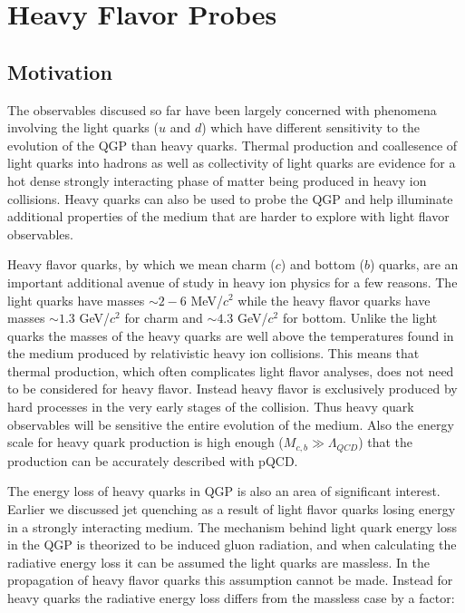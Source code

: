 \section{Heavy Flavor Probes}

\subsection{Motivation}

The observables discused so far have been largely concerned with phenomena involving the light quarks ($u$ and $d$) which have different sensitivity to the evolution of the QGP than heavy quarks. Thermal production and coallesence of light quarks into hadrons as well as collectivity of light quarks are evidence for a hot dense strongly interacting phase of matter being produced in heavy ion collisions. Heavy quarks can also be used to probe the QGP and help illuminate additional properties of the medium that are harder to explore with light flavor observables. 

Heavy flavor quarks, by which we mean charm ($c$) and bottom ($b$) quarks, are an important additional avenue of study in heavy ion physics for a few reasons. The light quarks have masses $\sim2-6$ MeV/$c^2$ while the heavy flavor quarks have masses $\sim1.3$ GeV/$c^2$ for charm and $\sim4.3$ GeV/$c^2$ for bottom. Unlike the light quarks the masses of the heavy quarks are well above the temperatures found in the medium produced by relativistic heavy ion collisions. This means that thermal production, which often complicates light flavor analyses, does not need to be considered for heavy flavor. Instead heavy flavor is exclusively produced by hard processes in the very early stages of the collision. Thus heavy quark observables will be sensitive the entire evolution of the medium. Also the energy scale for heavy quark production is high enough ($M_{c,b} \gg \Lambda_{QCD}$) that the production can be accurately described with pQCD.

The energy loss of heavy quarks in QGP is also an area of significant interest. Earlier we discussed jet quenching as a result of light flavor quarks losing energy in a strongly interacting medium. The mechanism behind light quark energy loss in the QGP is theorized to be induced gluon radiation, and when calculating the radiative energy loss it can be assumed the light quarks are massless. In the propagation of heavy flavor quarks this assumption cannot be made. Instead for heavy quarks the radiative energy loss differs from the massless case by a factor:

